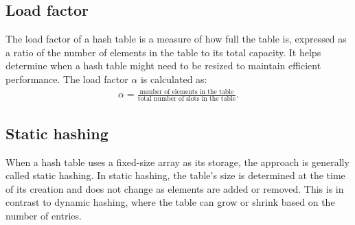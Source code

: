 \documentclass{report}
\begin{document}
\bigbreak \noindent 
\subsection{Load factor}
\bigbreak \noindent 
The load factor of a hash table is a measure of how full the table is, expressed as a ratio of the number of elements in the table to its total capacity. It helps determine when a hash table might need to be resized to maintain efficient performance.
\bigbreak \noindent 
The load factor $\alpha$ is calculated as:
\begin{align*}
\alpha = \frac{\text{number of elements in the table}}{\text{total number of slots in the table}}
.\end{align*}



\bigbreak \noindent 
\subsection{Static hashing}
\bigbreak \noindent 
When a hash table uses a fixed-size array as its storage, the approach is generally called static hashing. In static hashing, the table’s size is determined at the time of its creation and does not change as elements are added or removed. This is in contrast to dynamic hashing, where the table can grow or shrink based on the number of entries.
\bigbreak \noindent 
\end{document}
